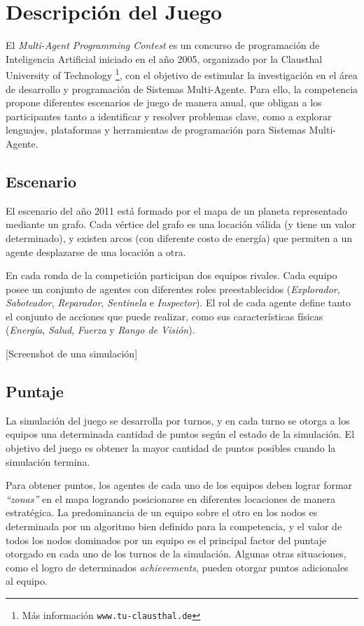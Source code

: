 \section{Descripción del Juego}

El \textit{Multi-Agent Programming Contest} es un concurso de programación de Inteligencia Artificial iniciado en el año 2005, organizado por la Clausthal University of Technology 
\footnote{Más información \texttt{www.tu-clausthal.de}}, con el objetivo de estimular la investigación en el área de desarrollo y programación de Sistemas Multi-Agente. Para ello, la competencia propone diferentes escenarios de juego de manera anual, que obligan a los participantes tanto a identificar y resolver problemas clave, como a explorar lenguajes, plataformas y herramientas de programación para Sistemas Multi-Agente.

\subsection{Escenario}

El escenario del año 2011 está formado por el mapa de un planeta representado mediante un grafo. 
Cada vértice del grafo es una locación válida (y tiene un valor determinado), y existen arcos (con diferente costo de energía) que permiten a un agente desplazarse de una locación a otra.

En cada ronda de la competición participan dos equipos rivales. Cada equipo posee un conjunto de agentes con diferentes roles preestablecidos (\textit{Explorador}, \textit{Saboteador}, \textit{Reparador}, \textit{Sentinela} e \textit{Inspector}). El rol de cada agente define tanto el conjunto de acciones que puede realizar, como sus características físicas (\textit{Energía}, \textit{Salud}, \textit{Fuerza} y \textit{Rango de Visión}).


[Screenshot de una simulación]

\subsection{Puntaje}

La simulación del juego se desarrolla por turnos, y en cada turno se otorga a los equipos una determinada cantidad de puntos según el estado de la simulación. El objetivo del juego es obtener la mayor cantidad de puntos posibles cuando la simulación termina.

Para obtener puntos, los agentes de cada uno de los equipos deben lograr formar \textit{``zonas''} en el mapa logrando posicionarse en diferentes locaciones de manera estratégica. La predominancia de un equipo sobre el otro en los nodos es determinada por un algoritmo bien definido para la competencia, y el valor de todos los nodos dominados por un equipo es el principal factor del puntaje otorgado en cada uno de los turnos de la simulación. Algunas otras situaciones, como el logro de determinados \textit{achievements}, pueden otorgar puntos adicionales al equipo.

